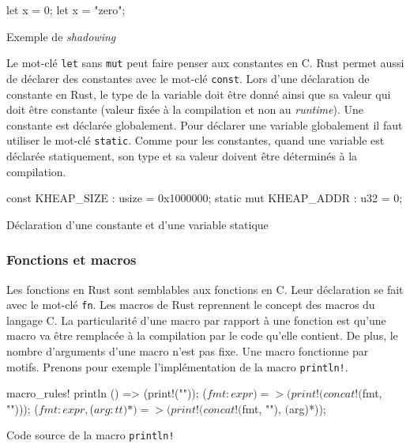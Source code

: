 \begin{code}
\begin{rustcode}
let x = 0;
let x = "zero";
\end{rustcode}
\caption{Exemple de \textit{shadowing}}
\label{lst:rust:var3}
\end{code} \bigbreak

Le mot-clé \texttt{let} sans \texttt{mut} peut faire penser
aux constantes en C. Rust permet aussi de déclarer des constantes avec le mot-clé
\texttt{const}. Lors d'une déclaration de constante en Rust, le type
de la variable doit être donné ainsi que sa valeur qui doit être constante (valeur
fixée à la compilation et non au \textit{runtime}). Une constante est déclarée
globalement. Pour déclarer une variable globalement il faut utiliser le mot-clé
\texttt{static}. Comme pour les constantes, quand une variable est déclarée
statiquement, son type et sa valeur doivent être déterminés à la compilation.

\begin{code}
\begin{rustcode}
const KHEAP_SIZE        : usize = 0x1000000;
static mut KHEAP_ADDR   : u32   = 0;
\end{rustcode}
\caption{Déclaration d'une constante et d'une variable statique}
\label{lst:rust:var4}
\end{code} \bigbreak


\subsubsection{Fonctions et macros}
Les fonctions en Rust sont semblables aux fonctions en C. Leur déclaration se fait
avec le mot-clé \texttt{fn}. Les macros de Rust reprennent le concept
des macros du langage C. La particularité d'une macro par rapport à une fonction
est qu'une macro va être remplacée à la compilation par le code qu'elle contient.
De plus, le nombre d'arguments d'une macro n'est pas fixe. Une macro fonctionne
par motifs. Prenons pour exemple l'implémentation de la macro \texttt{println!}. \\

\begin{code}
\begin{rustcode}
macro_rules! println {
    () => (print!("\n"));
    ($fmt:expr) => (print!(concat!($fmt, "\n")));
    ($fmt:expr, $($arg:tt)*) => (print!(concat!($fmt, "\n"), $($arg)*));
}
\end{rustcode}
\caption{Code source de la macro \texttt{println!}}
\label{lst:rust:macro}
\end{code} \bigbreak


